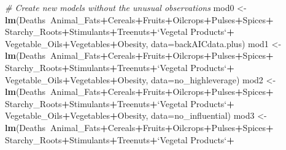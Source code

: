 \documentclass[
]{article}
\newenvironment{Shaded}{\begin{snugshade}}{\end{snugshade}}
\newcommand{\CommentTok}[1]{\textcolor[rgb]{0.56,0.35,0.01}{\textit{#1}}}
\newcommand{\DataTypeTok}[1]{\textcolor[rgb]{0.13,0.29,0.53}{#1}}
\newcommand{\KeywordTok}[1]{\textcolor[rgb]{0.13,0.29,0.53}{\textbf{#1}}}
\newcommand{\NormalTok}[1]{#1}
\newcommand{\OperatorTok}[1]{\textcolor[rgb]{0.81,0.36,0.00}{\textbf{#1}}}
\newcommand{\StringTok}[1]{\textcolor[rgb]{0.31,0.60,0.02}{#1}}
\begin{document}
\begin{Shaded}
\begin{Highlighting}[]
\CommentTok{# Create new models without the unusual observations}
\NormalTok{mod0 <-}\StringTok{ }\KeywordTok{lm}\NormalTok{(Deaths}\OperatorTok{~}\NormalTok{Animal_Fats}\OperatorTok{+}\NormalTok{Cereals}\OperatorTok{+}\NormalTok{Fruits}\OperatorTok{+}\NormalTok{Oilcrops}\OperatorTok{+}\NormalTok{Pulses}\OperatorTok{+}\NormalTok{Spices}\OperatorTok{+}
\StringTok{             }\NormalTok{Starchy_Roots}\OperatorTok{+}\NormalTok{Stimulants}\OperatorTok{+}\NormalTok{Treenuts}\OperatorTok{+}\StringTok{`}\DataTypeTok{Vegetal Products}\StringTok{`}\OperatorTok{+}
\StringTok{             }\NormalTok{Vegetable_Oils}\OperatorTok{+}\NormalTok{Vegetables}\OperatorTok{+}\NormalTok{Obesity, }\DataTypeTok{data=}\NormalTok{backAICdata.plus)}
\NormalTok{mod1 <-}\StringTok{ }\KeywordTok{lm}\NormalTok{(Deaths}\OperatorTok{~}\NormalTok{Animal_Fats}\OperatorTok{+}\NormalTok{Cereals}\OperatorTok{+}\NormalTok{Fruits}\OperatorTok{+}\NormalTok{Oilcrops}\OperatorTok{+}\NormalTok{Pulses}\OperatorTok{+}\NormalTok{Spices}\OperatorTok{+}
\StringTok{             }\NormalTok{Starchy_Roots}\OperatorTok{+}\NormalTok{Stimulants}\OperatorTok{+}\NormalTok{Treenuts}\OperatorTok{+}\StringTok{`}\DataTypeTok{Vegetal Products}\StringTok{`}\OperatorTok{+}
\StringTok{             }\NormalTok{Vegetable_Oils}\OperatorTok{+}\NormalTok{Vegetables}\OperatorTok{+}\NormalTok{Obesity, }\DataTypeTok{data=}\NormalTok{no_highleverage)}
\NormalTok{mod2 <-}\StringTok{ }\KeywordTok{lm}\NormalTok{(Deaths}\OperatorTok{~}\NormalTok{Animal_Fats}\OperatorTok{+}\NormalTok{Cereals}\OperatorTok{+}\NormalTok{Fruits}\OperatorTok{+}\NormalTok{Oilcrops}\OperatorTok{+}\NormalTok{Pulses}\OperatorTok{+}\NormalTok{Spices}\OperatorTok{+}
\StringTok{             }\NormalTok{Starchy_Roots}\OperatorTok{+}\NormalTok{Stimulants}\OperatorTok{+}\NormalTok{Treenuts}\OperatorTok{+}\StringTok{`}\DataTypeTok{Vegetal Products}\StringTok{`}\OperatorTok{+}
\StringTok{             }\NormalTok{Vegetable_Oils}\OperatorTok{+}\NormalTok{Vegetables}\OperatorTok{+}\NormalTok{Obesity, }\DataTypeTok{data=}\NormalTok{no_influential)}
\NormalTok{mod3 <-}\StringTok{ }\KeywordTok{lm}\NormalTok{(Deaths}\OperatorTok{~}\NormalTok{Animal_Fats}\OperatorTok{+}\NormalTok{Cereals}\OperatorTok{+}\NormalTok{Fruits}\OperatorTok{+}\NormalTok{Oilcrops}\OperatorTok{+}\NormalTok{Pulses}\OperatorTok{+}\NormalTok{Spices}\OperatorTok{+}
\StringTok{             }\NormalTok{Starchy_Roots}\OperatorTok{+}\NormalTok{Stimulants}\OperatorTok{+}\NormalTok{Treenuts}\OperatorTok{+}\StringTok{`}\DataTypeTok{Vegetal Products}\StringTok{`}\OperatorTok{+}

\end{Highlighting}
\end{Shaded}
\end{document}
